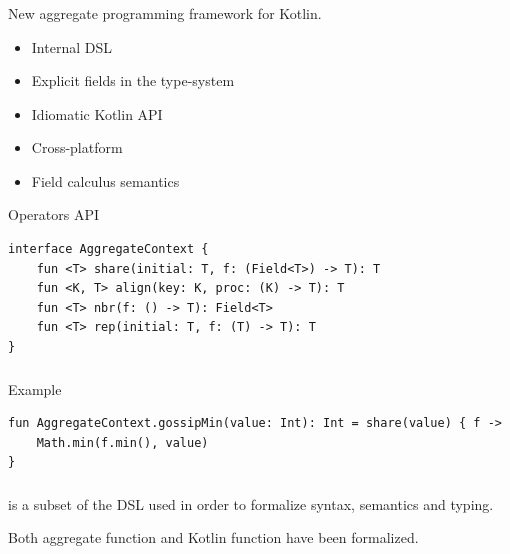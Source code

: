 \begin{frame}[fragile]
\frametitle{\Kotac}
\begin{block}{}
New aggregate programming framework for Kotlin.
\begin{itemize}
\item Internal DSL
\item Explicit fields in the type-system
\item Idiomatic Kotlin API
\item Cross-platform
\item Field calculus semantics
\end{itemize}
\end{block}
\begin{block}{Operators API}
\begin{lstlisting}[language={kotac}]
interface AggregateContext {
    fun <T> share(initial: T, f: (Field<T>) -> T): T
    fun <K, T> align(key: K, proc: (K) -> T): T
    fun <T> nbr(f: () -> T): Field<T>
    fun <T> rep(initial: T, f: (T) -> T): T
}
\end{lstlisting}
\end{block}
\end{frame}

\begin{frame}[fragile]
\frametitle{\Kotac}
\begin{block}{Example}
\begin{lstlisting}[language={kotac}]
fun AggregateContext.gossipMin(value: Int): Int = share(value) { f ->
	Math.min(f.min(), value)
}
\end{lstlisting}
\end{block}
\end{frame}

\begin{frame}
\frametitle{\FKotac}
\begin{block}{}
\FKotac{} is a subset of the \Kotac{} DSL used in order to formalize syntax, semantics and typing.

Both aggregate function and Kotlin function have been formalized.
\end{block}
\end{frame}

